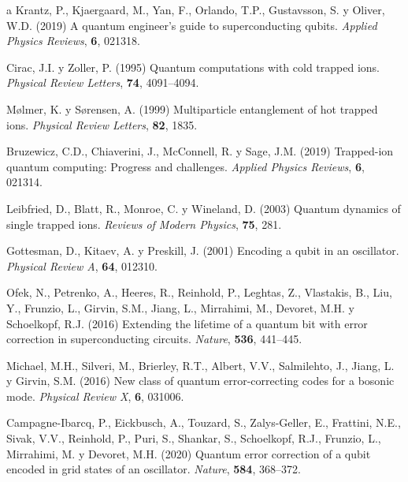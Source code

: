 \documentclass[11pt,a4paper,spanish]{book}
\begin{document}
\begin{thebibliography}{a}
 Krantz, P., Kjaergaard, M., Yan, F., Orlando, T.P., Gustavsson, S. y Oliver, W.D. (2019) A quantum engineer's guide to superconducting qubits. \textit{Applied Physics Reviews}, \textbf{6}, 021318.


 Cirac, J.I. y Zoller, P. (1995) Quantum computations with cold trapped ions. \textit{Physical Review Letters}, \textbf{74}, 4091--4094.

 Mølmer, K. y Sørensen, A. (1999) Multiparticle entanglement of hot trapped ions. \textit{Physical Review Letters}, \textbf{82}, 1835.

 Bruzewicz, C.D., Chiaverini, J., McConnell, R. y Sage, J.M. (2019) Trapped-ion quantum computing: Progress and challenges. \textit{Applied Physics Reviews}, \textbf{6}, 021314.

 Leibfried, D., Blatt, R., Monroe, C. y Wineland, D. (2003) Quantum dynamics of single trapped ions. \textit{Reviews of Modern Physics}, \textbf{75}, 281.


 Gottesman, D., Kitaev, A. y Preskill, J. (2001) Encoding a qubit in an oscillator. \textit{Physical Review A}, \textbf{64}, 012310.

 Ofek, N., Petrenko, A., Heeres, R., Reinhold, P., Leghtas, Z., Vlastakis, B., Liu, Y., Frunzio, L., Girvin, S.M., Jiang, L., Mirrahimi, M., Devoret, M.H. y Schoelkopf, R.J. (2016) Extending the lifetime of a quantum bit with error correction in superconducting circuits. \textit{Nature}, \textbf{536}, 441--445.

 Michael, M.H., Silveri, M., Brierley, R.T., Albert, V.V., Salmilehto, J., Jiang, L. y Girvin, S.M. (2016) New class of quantum error-correcting codes for a bosonic mode. \textit{Physical Review X}, \textbf{6}, 031006.

 Campagne-Ibarcq, P., Eickbusch, A., Touzard, S., Zalys-Geller, E., Frattini, N.E., Sivak, V.V., Reinhold, P., Puri, S., Shankar, S., Schoelkopf, R.J., Frunzio, L., Mirrahimi, M. y Devoret, M.H. (2020) Quantum error correction of a qubit encoded in grid states of an oscillator. \textit{Nature}, \textbf{584}, 368--372.


\end{thebibliography}
\end{document}
